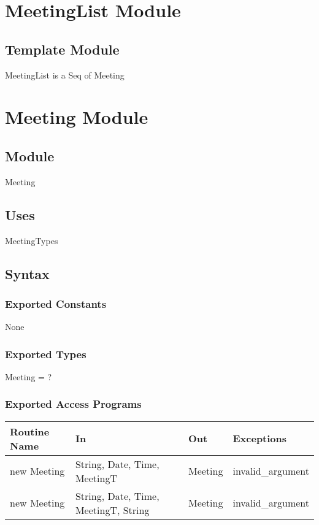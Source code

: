 \documentclass[12pt, titlepage]{article}
\begin{document}

\section* {MeetingList Module}

\subsection*{Template Module}
MeetingList is a Seq of Meeting

\newpage

\section* {Meeting Module}

\subsection*{Module}

Meeting

\subsection* {Uses}

MeetingTypes

\subsection* {Syntax}

\subsubsection* {Exported Constants}

None

\subsubsection* {Exported Types}

Meeting = ?

\subsubsection* {Exported Access Programs}

\begin{tabular}{|l|l|l|l|}
    \hline
    \textbf{Routine Name} & \textbf{In} & \textbf{Out} & \textbf{Exceptions} \\
    \hline
    new Meeting & String, Date, Time, MeetingT & Meeting & invalid\_argument\\
    new Meeting & String, Date, Time, MeetingT, String & Meeting & invalid\_argument\\
    \hline
\end{tabular}
\end{document}

